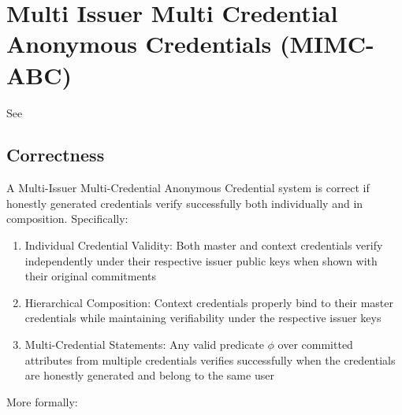 \cleardoublepage

\section{Multi Issuer Multi Credential Anonymous Credentials (MIMC-ABC)}\label{sec:mimc}
See 

\subsection{Correctness}
A Multi-Issuer Multi-Credential Anonymous Credential system is correct if honestly generated credentials verify successfully both individually and in composition. Specifically:

\begin{enumerate}
    \item Individual Credential Validity: Both master and context credentials verify independently under their respective issuer public keys when shown with their original commitments
    \item Hierarchical Composition: Context credentials properly bind to their master credentials while maintaining verifiability under the respective issuer keys
    \item Multi-Credential Statements: Any valid predicate $\phi$ over committed attributes from multiple credentials verifies successfully when the credentials are honestly generated and belong to the same user
\end{enumerate}

\noindent More formally:

